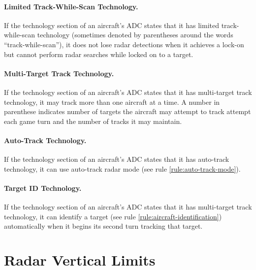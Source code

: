 \begin{advancedrules}
{%

\paragraph{Limited Track-While-Scan Technology.} If the technology section of an aircraft’s ADC states that it has limited track-while-scan technology (sometimes denoted by parentheses around the words “track-while-scan”), it does not lose radar detections when it achieves a lock-on but cannot perform radar searches while locked on to a target.

\paragraph{Multi-Target Track Technology.}\label{rule:multi-target-track-technology}  If the technology section of an aircraft’s ADC states that it has multi-target track technology, it may track more than one aircraft at a time. A number in parenthese indicates number of targets the aircraft may attempt to track attempt each game turn and the number of tracks it may maintain. 

\paragraph{Auto-Track Technology.}\label{rule:auto-track-technology} If the technology section of an aircraft’s ADC states that it has auto-track technology, it can use auto-track radar mode (see rule \ref{rule:auto-track-mode}).

\paragraph{Target ID Technology.}\label{rule:target-id-technology} If the technology section of an aircraft’s ADC states that it has multi-target track technology, it can identify a target (see rule \ref{rule:aircraft-identification}) automatically when it begins its second turn tracking that target.
}


\section{Radar Vertical Limits}
\label{rule:radar-vertical-limits}
\x{
}
\end{advancedrules}
